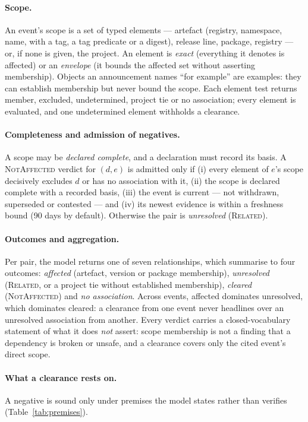 \documentclass[11pt]{article}
\begin{document}
\paragraph{Scope.} An event's scope is a set of typed elements --- artefact
(registry, namespace, name, with a tag, a tag predicate or a digest), release
line, package, registry --- or, if none is given, the project. An element is
\emph{exact} (everything it denotes is affected) or an \emph{envelope}
(it bounds the affected set without asserting membership). Objects an
announcement names ``for example'' are examples: they can establish membership
but never bound the scope. Each element test returns member, excluded,
undetermined, project tie or no association; every element is evaluated, and
one undetermined element withholds a clearance.

\paragraph{Completeness and admission of negatives.} A scope may be
\emph{declared complete}, and a declaration must record its basis. A
\textsc{NotAffected} verdict for $(d,e)$ is admitted only if (i) every element
of $e$'s scope decisively excludes $d$ or has no association with it, (ii) the
scope is declared complete with a recorded basis, (iii) the event is current
--- not withdrawn, superseded or contested --- and (iv) its newest evidence is
within a freshness bound (90 days by default). Otherwise the pair is
\emph{unresolved} (\textsc{Related}).

\paragraph{Outcomes and aggregation.} Per pair, the model returns one of seven
relationships, which summarise to four outcomes: \emph{affected}
(artefact, version or package membership), \emph{unresolved} (\textsc{Related},
or a project tie without established membership), \emph{cleared}
(\textsc{NotAffected}) and \emph{no association}. Across events, affected
dominates unresolved, which dominates cleared: a clearance from one event
never headlines over an unresolved association from another. Every verdict
carries a closed-vocabulary statement of what it does \emph{not} assert:
scope membership is not a finding that a dependency is broken or unsafe, and a
clearance covers only the cited event's direct scope.

\paragraph{What a clearance rests on.} A negative is sound only under premises
the model states rather than verifies (Table~\ref{tab:premises}).
\end{document}
